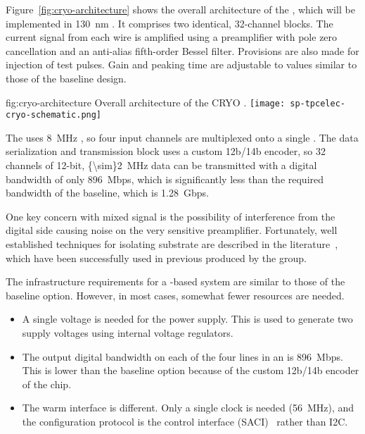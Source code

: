 Figure~\ref{fig:cryo-architecture} shows the overall architecture of the  , which will be implemented in \SI{130}{nm} .
It comprises two identical, \num{32}-channel blocks. 
The current signal from each wire is amplified using a preamplifier with pole zero cancellation and an anti-alias fifth-order Bessel filter. 
Provisions are also made for injection of test pulses. 
Gain and peaking time are adjustable to values similar to those of the baseline design.

\begin{dunefigure}
{fig:cryo-architecture}
{Overall architecture of the CRYO .}
\texttt{[image: sp-tpcelec-cryo-schematic.png]}
\end{dunefigure}

The  uses \SI{8}{MHz} , so four input channels are multiplexed onto a single . The data serialization and transmission block uses a custom 12b/14b encoder, so \num{32} channels of \num{12}-bit, \SI{{\sim}2}{MHz} data can be transmitted with a digital bandwidth of only \SI{896}{Mbps}, which is significantly less than the required bandwidth of the baseline, which is \SI{1.28}{Gbps}.

One key concern with mixed signal  is the possibility of interference from the digital side causing noise on the very sensitive preamplifier. 
Fortunately, well established techniques for isolating substrate are described in the literature~\cite{yeh}, which have been successfully used in previous  produced by the  group.%


The infrastructure requirements for a  -based system are similar to those of the baseline option. However, in most cases, somewhat fewer resources are needed.
\begin{itemize}
\item{A single voltage is needed for the power supply. This is used to generate two supply voltages using internal voltage regulators.}
\item{The output digital bandwidth on each of the four lines in an  is \SI{896}{Mbps}. This is lower than the baseline option because of the custom 12b/14b encoder of the  chip. }
\item{The warm interface is different. Only a single clock is needed (\SI{56}{MHz}), and the configuration protocol is the   control interface (SACI)~\cite{SACI} rather than I2C.} 
\end{itemize}

